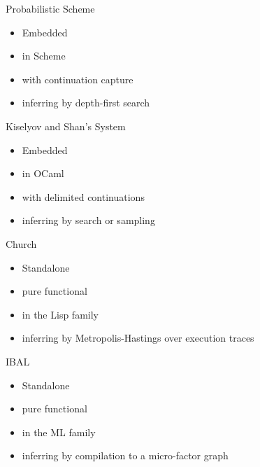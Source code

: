 \documentclass{beamer}
\begin{document}
\begin{frame}
\begin{center}\Huge Probabilistic Scheme\end{center}
\begin{itemize}
\item Embedded
\item in Scheme
\item with continuation capture
\item inferring by depth-first search
\end{itemize}
\end{frame}

\begin{frame}
\begin{center}\Huge Kiselyov and Shan's System\end{center}
\begin{itemize}
\item Embedded
\item in OCaml
\item with delimited continuations
\item inferring by search or sampling
\end{itemize}
\end{frame}

\begin{frame}
\begin{center}\Huge Church\end{center}
\begin{itemize}
\item Standalone
\item pure functional
\item in the Lisp family
\item inferring by Metropolis-Hastings over execution traces
\end{itemize}
\end{frame}

\begin{frame}
\begin{center}\Huge IBAL\end{center}
\begin{itemize}
\item Standalone
\item pure functional
\item in the ML family
\item inferring by compilation to a micro-factor graph
\end{itemize}
\end{frame}
\end{document}
